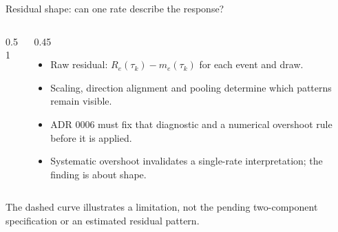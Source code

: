 \documentclass[aspectratio=169,11pt]{beamer}
\newcommand{\source}[1]{\par\vfill{\scriptsize\color{muted}#1}\par}
\begin{document}
\begin{frame}{Residual shape: can one rate describe the response?}
\begin{columns}[c,onlytextwidth]
\begin{column}{0.51\textwidth}
\end{column}
\begin{column}{0.45\textwidth}\begin{itemize}
\item Raw residual: $R_e(\tau_k)-m_e(\tau_k)$ for each event and draw.
\item Scaling, direction alignment and pooling determine which patterns remain visible.
\item ADR 0006 must fix that diagnostic and a numerical overshoot rule before it is applied.
\item Systematic overshoot invalidates a single-rate interpretation; the finding is about shape.
\end{itemize}\end{column}\end{columns}
\source{The dashed curve illustrates a limitation, not the pending two-component specification or an estimated residual pattern.}
\end{frame}
\end{document}
